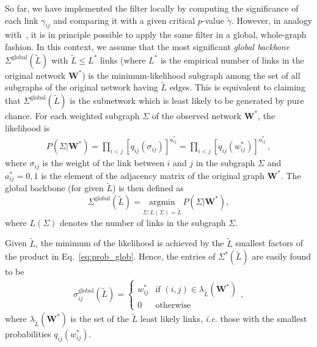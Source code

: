 \documentclass[aps,twocolumn,superscriptaddress]{revtex4-1}
\newcommand{\ie}{\emph{i.e.} }
\begin{document}
So far, we have implemented the filter locally by computing the significance of each link $\gamma_{ij}$ and comparing it with a given critical $p$-value $\widetilde{\gamma}$. However, in analogy with~\cite{dianati-pre-2016}, it is in principle possible to apply the same filter in a global, whole-graph fashion. In this context, we assume that the most significant \emph{global backbone} $\bm{\varSigma}^\textrm{global}(\widetilde{L})$ with $ \widetilde{L}\le L^\ast$ links (where $L^\ast$ is the empirical number of links in the original network $\bm{W^{\ast}}$) is the minimum-likelihood subgraph among the set of all subgraphs of the original network having $\widetilde{L}$ edges. 
This is equivalent to claiming that $\bm{\varSigma}^\textrm{global}(\widetilde{L})$ is the subnetwork which is least likely to be generated by pure chance. For each weighted subgraph $\bm{\varSigma}$ of the observed network $\bm{W^{\ast}}$, the likelihood is
%
%
\begin{eqnarray}
\label{eq:prob_glob}
P(\bm{\varSigma}|\bm{W^{\ast}}) = \prod_{i < j}^{} \left[ q_{ij} (\sigma_{ij})  \right]^{a^\ast_{ij}} = \prod_{i < j}\left[ q_{ij} (w_{ij}^\ast)  \right]^{a^\ast_{ij}} \,,
\end{eqnarray}
%
%
where $\sigma_{ij}$ is the weight of the link between $i$ and $j$ in the subgraph $\bm{\varSigma}$ and $a^\ast_{ij} = 0,1$ is the element of the adjacency matrix of the original graph $\bm{W^{\ast}}$. 
The global backbone (for given $\widetilde{L}$) is then defined as
\begin{equation}
\bm{\varSigma}^\textrm{global}(\widetilde{L}) = \underset{\bm{\varSigma}:L(\bm{\varSigma})=\widetilde{L}}{\mathrm{argmin}}\,P(\bm{\varSigma}|\bm{W^{\ast}}),
\end{equation}
where $L(\bm{\varSigma})$ denotes the number of links in the subgraph $\bm{\varSigma}$.

Given $\widetilde{L}$, the minimum of the likelihood is achieved by the $\widetilde{L}$ smallest factors of the product in Eq.~\eqref{eq:prob_glob}. 
Hence, the entries of $\bm{\varSigma^{\ast}}(\widetilde{L})$ are easily found to be
%
%
\begin{eqnarray}
\sigma_{ij}^\textrm{global}(\widetilde{L}) = \left\{
     \begin{array}{cl}
        w^\ast_{ij} & \mbox{if } (i,j) \in \lambda_{\widetilde{L}} (\bm{W^{\ast}}) \\
       0      & \mbox{otherwise}
     \end{array} 
    \right.,\nonumber
\end{eqnarray}
%
%
where $ \lambda_{\widetilde{L}} (\bm{W^{\ast}}) $ is the set of the $\widetilde{L}$ least likely links, \ie those with the smallest probabilities $ q_{ij} (w^\ast_{ij}) $. 
\end{document}
